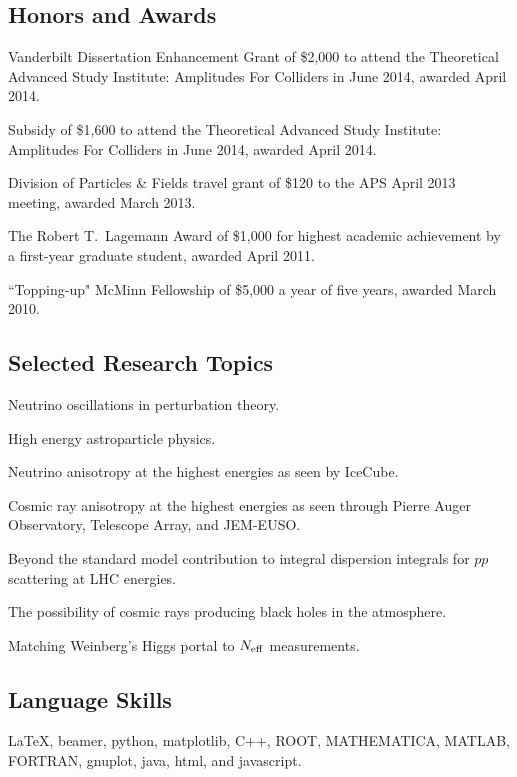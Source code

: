 \documentclass[letterpaper]{article}
\renewenvironment{itemize}{
\begin{list}{}{
\setlength{\leftmargin}{1.5em}
}
}{
\end{list}
}
\begin{document}
\subsection*{Honors and Awards}
\begin{itemize}
\item Vanderbilt Dissertation Enhancement Grant of \$2,000 to attend the Theoretical Advanced Study Institute: Amplitudes For Colliders
in June 2014, awarded April 2014.
\item Subsidy of \$1,600 to attend the Theoretical Advanced Study Institute: Amplitudes For Colliders in June 2014, awarded April 2014.
\item Division of Particles \& Fields travel grant of \$120 to the APS April 2013 meeting, awarded March 2013.
\item The Robert T.~Lagemann Award of \$1,000 for highest academic achievement by a first-year graduate student, awarded April 2011.
\item ``Topping-up" McMinn Fellowship of \$5,000 a year of five years, awarded March 2010.
\end{itemize}

\subsection*{Selected Research Topics}
\begin{itemize}
\item Neutrino oscillations in perturbation theory.
\item High energy astroparticle physics.
\item Neutrino anisotropy at the highest energies as seen by IceCube.
\item Cosmic ray anisotropy at the highest energies as seen through Pierre Auger Observatory, Telescope Array, and JEM-EUSO.
\item Beyond the standard model contribution to integral dispersion integrals for $pp$ scattering at LHC energies.
\item The possibility of cosmic rays producing black holes in the atmosphere.
\item Matching Weinberg's Higgs portal to $N_{\rm{eff}}$ measurements.
\end{itemize}

\subsection*{Language Skills}
\begin{itemize}
\item 
\LaTeX, beamer, python, matplotlib, C++, ROOT, MATHEMATICA, MATLAB, FORTRAN, gnuplot, java, html, and javascript.
\end{itemize}
\end{document}

